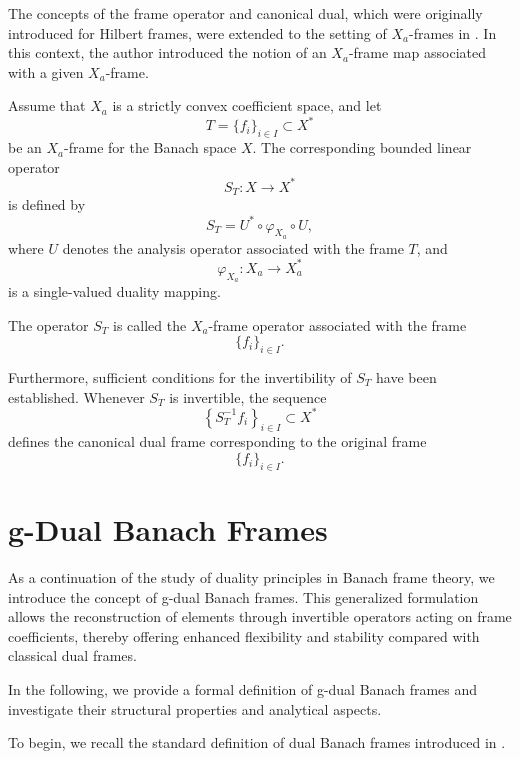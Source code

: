 \documentclass[12pt]{article}
\theoremstyle{definition}
\theoremstyle{remark}
\begin{document}
\medskip
 The concepts of the frame operator and canonical dual, which were originally introduced for Hilbert frames, were extended to the setting of \(X_a\)-frames in \cite{Stoeva2008}. In this context, the author introduced the notion of an \(X_a\)-frame map associated with a given \(X_a\)-frame.
 
 Assume that \(X_a\) is a strictly convex coefficient space, and let
 \[
 T=\{f_i\}_{i\in I}\subset X^*
 \]
 be an \(X_a\)-frame for the Banach space \(X\). The corresponding bounded linear operator
 \[
 S_T:X\longrightarrow X^*
 \]
 is defined by
 \[
 S_T=U^*\circ\varphi_{X_a}\circ U,
 \]
 where \(U\) denotes the analysis operator associated with the frame \(T\), and
 \[
 \varphi_{X_a}:X_a\longrightarrow X_a^*
 \]
 is a single-valued duality mapping.
 
 The operator \(S_T\) is called the \(X_a\)-frame operator associated with the frame
 \[
 \{f_i\}_{i\in I}.
 \]
 
 Furthermore, sufficient conditions for the invertibility of \(S_T\) have been established. Whenever \(S_T\) is invertible, the sequence
 \[
 \left\{S_T^{-1}f_i\right\}_{i\in I}\subset X^*
 \]
 defines the canonical dual frame corresponding to the original frame
  \[
 \{f_i\}_{i\in I}.
 \]
 \section{g-Dual Banach Frames}
                                                                                                                              
 As a continuation of the study of duality principles in Banach frame theory, we introduce the concept of g-dual Banach frames. This generalized formulation allows the reconstruction of elements through invertible operators acting on frame coefficients, thereby offering enhanced flexibility and stability compared with classical dual frames.
 
 In the following, we provide a formal definition of g-dual Banach frames and investigate their structural properties and analytical aspects.
 
 \medskip
 
 To begin, we recall the standard definition of dual Banach frames introduced in \cite{Karimizad2014}.
\end{document}
